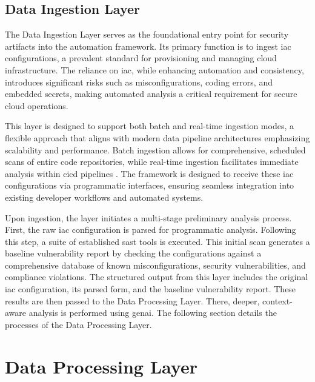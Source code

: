 \subsection{Data Ingestion Layer} %
\label{sec:data-ingestion-layer}

The Data Ingestion Layer serves as the foundational entry point for security artifacts into the automation framework. Its primary function is to ingest \gls{iac} configurations, a prevalent standard for provisioning and managing cloud infrastructure. The reliance on \gls{iac}, while enhancing automation and consistency, introduces significant risks such as misconfigurations, coding errors, and embedded secrets, making automated analysis a critical requirement for secure cloud operations.

This layer is designed to support both batch and real-time ingestion modes, a flexible approach that aligns with modern data pipeline architectures emphasizing scalability and performance\cite{alevizos_towards_2024}. Batch ingestion allows for comprehensive, scheduled scans of entire code repositories, while real-time ingestion facilitates immediate analysis within \gls{cicd} pipelines \cite{gunathilaka_context-aware_2025}. The framework is designed to receive these \gls{iac} configurations via programmatic interfaces, ensuring seamless integration into existing developer workflows and automated systems.

Upon ingestion, the layer initiates a multi-stage preliminary analysis process. First, the raw \gls{iac} configuration is parsed for programmatic analysis. Following this step, a suite of established \gls{sast} tools is executed. This initial scan generates a baseline vulnerability report by checking the configurations against a comprehensive database of known misconfigurations, security vulnerabilities, and compliance violations. The structured output from this layer includes the original \gls{iac} configuration, its parsed form, and the baseline vulnerability report. These results are then passed to the Data Processing Layer. There, deeper, context-aware analysis is performed using \gls{genai}. The following section details the processes of the Data Processing Layer.


\section{Data Processing Layer}
\label{sec:data-processing-layer}

